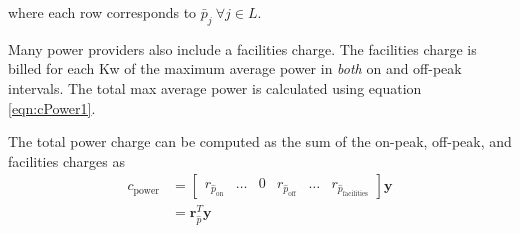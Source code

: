 where each row corresponds to $\bar{p}_j \ \forall j \in L$.
\par Many power providers also include a facilities charge.  The facilities charge is billed for each Kw of the maximum average power in \textit{both} on and off-peak intervals. The total max average power is calculated using equation \ref{eqn:cPower1}.
\par The total power charge can be computed as the sum of the on-peak, off-peak, and facilities charges as 
\begin{equation}
	\begin{aligned}
		c_\text{power} &= \begin{bmatrix}r_{\hat{p}_{\text{on}}} & \hdots & 0 & r_{\hat{p}_{\text{off}}} & \hdots & r_{\hat{p}_{\text{facilities}}} \end{bmatrix}\mathbf{y} \\
			&= \mathbf{r}_{\hat{p}}^T\mathbf{y}
	\end{aligned}
\end{equation}

